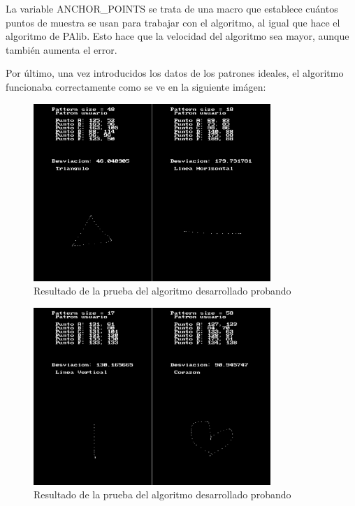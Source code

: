 \vspace{0.5cm}

La variable ANCHOR\_POINTS se trata de una macro que establece cuántos puntos de muestra se usan para trabajar con el algoritmo, al igual que hace el algoritmo de PAlib. Esto hace que la velocidad del algoritmo sea mayor, aunque también aumenta el error.

\vspace{0.5cm}

Por último, una vez introducidos los datos de los patrones ideales, el algoritmo funcionaba correctamente como se ve en la siguiente imágen:

\vspace{0.5cm}

\begin{figure}[htbp]
\centering
  \includegraphics[width=0.8\textwidth]{archivos/pattern_test_1.png}
  \caption{Resultado de la prueba del algoritmo desarrollado probando}
  \label{fig:pattern_test_1}
\end{figure}

\clearpage

\begin{figure}[htbp]
\centering
  \includegraphics[width=0.8\textwidth]{archivos/pattern_test_2.png}
  \caption{Resultado de la prueba del algoritmo desarrollado probando}
  \label{fig:pattern_test_2}
\end{figure}

